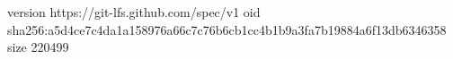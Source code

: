 version https://git-lfs.github.com/spec/v1
oid sha256:a5d4ce7c4da1a158976a66c7c76b6cb1cc4b1b9a3fa7b19884a6f13db6346358
size 220499
